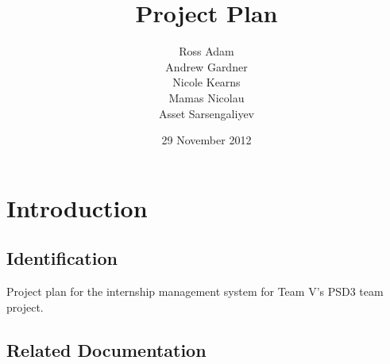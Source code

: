 \documentclass{l3deliverable}
\title{Project Plan}
\author{
  Ross Adam \\
  Andrew Gardner \\
  Nicole Kearns \\
  Mamas Nicolau \\
  Asset Sarsengaliyev \\
  }
\date{29 November 2012}
\begin{document}

\maketitle

\tableofcontents

\newpage


\section{Introduction}

\subsection{Identification}

Project plan for the internship management system for Team V's PSD3 team project.

\subsection{Related Documentation}
\end{document}
